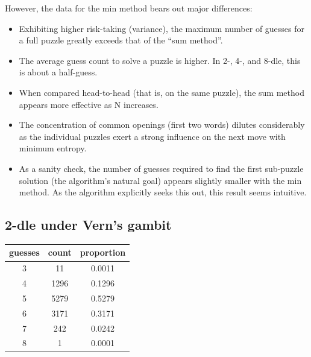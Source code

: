 \documentclass[11pt, oneside]{article} 	%
\begin{document}
However, the data for the min method bears out major differences:
\begin{itemize}
\item Exhibiting higher risk-taking (variance), the maximum number of guesses for a full puzzle greatly exceeds that of the ``sum method''.
\item The average guess count to solve a puzzle is higher. In 2-, 4-, and 8-dle, this is about a half-guess. 
\item When compared head-to-head (that is, on the same puzzle), the sum method appears more effective as N increases.
\item The concentration of common openings (first two words) dilutes considerably as the individual puzzles exert a strong influence on the next move with minimum entropy.
\item As a sanity check, the number of guesses required to find the first sub-puzzle solution (the algorithm's natural goal) appears slightly smaller with the min method. As the algorithm explicitly seeks this out, this result seems intuitive.
\end{itemize}



\subsection{2-dle under Vern's gambit}

\begin{center}
\begin{tabular}{ |c|c|c| }
 \hline
guesses & count & proportion \\
 \hline
3 & 11 & 0.0011 \\
4 & 1296 & 0.1296 \\
5 & 5279 & 0.5279 \\
6 & 3171 & 0.3171 \\
7 & 242 & 0.0242 \\
8 & 1 & 0.0001 \\
 \hline
\end{tabular}
\end{center}
\end{document}
